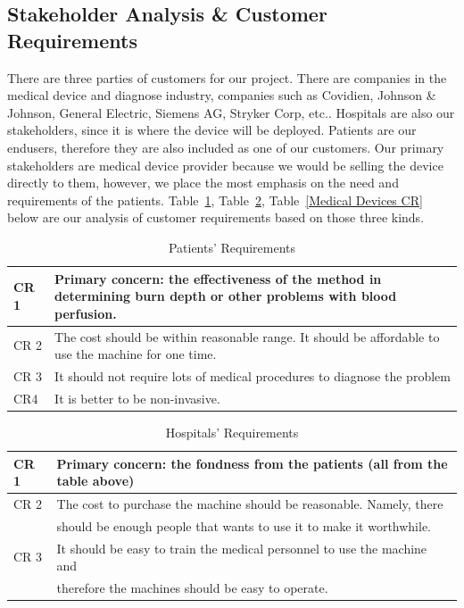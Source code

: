 \documentclass[paper=letter, fontsize=11pt]{scrartcl}
\numberwithin{equation}{section}		%
\numberwithin{figure}{section}			%
\numberwithin{table}{section}			%
\begin{document}
\subsection{Stakeholder Analysis \& Customer Requirements}
There are three parties of customers for our project. There are companies in the medical device and diagnose industry, companies such as Covidien, Johnson \& Johnson, General Electric, Siemens AG, Stryker Corp, etc.\cite{cres1}. Hospitals are also our stakeholders, since it is where the device will be deployed. Patients are our endusers, therefore they are also included as one of our customers.
Our primary stakeholders are medical device provider because we would be selling the device directly to them, however, we place the most emphasis on the need and requirements of the patients. Table~\ref{Patients CR}, Table~\ref{Hospitals CR}, Table~\ref{Medical Devices CR} below are our analysis of customer requirements based on those three kinds.
\begin {table}[H]
\centering
\begin{tabular}{l|p{12cm}}
CR 1 & Primary concern: the effectiveness of the method in determining burn depth or other problems with blood perfusion. \\ \hline
CR 2 & The cost should be within reasonable range. It should be affordable to use the machine for one time. \\ \hline
CR 3 & It should not require lots of medical procedures to diagnose the problem \\ \hline
CR4 & It is better to be non-invasive.
\end{tabular}
\caption{Patients' Requirements}
\label{Patients CR}
\end{table}

\begin {table}[H]
\centering
\begin{tabular}{l|p{12cm}}
CR 1 & Primary concern: the fondness from the patients (all from the table above) \\ \hline
CR 2 & The cost to purchase the machine should be reasonable. Namely, there \\ &should be enough people that wants to use it to make it worthwhile. \\ \hline
CR 3 &  It should be easy to train the medical personnel to use the machine and \\ & therefore the machines should be easy to operate. \\
\end{tabular}
\caption{Hospitals' Requirements}
\label{Hospitals CR}
\end {table}
\end{document}
